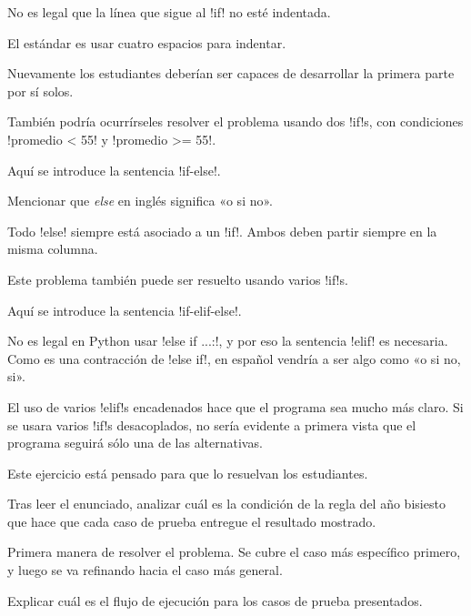 \documentclass[10pt]{article}
\begin{document}
  No es legal que la línea que sigue al \li!if! no esté indentada.

  El estándar es usar cuatro espacios para indentar.


  Nuevamente los estudiantes deberían ser capaces de desarrollar la primera parte por sí solos.

  También podría ocurrírseles resolver el problema usando dos \li!if!s,
  con condiciones \li!promedio < 55! y \li!promedio >= 55!.


  Aquí se introduce la sentencia \li!if-else!.
  
  Mencionar que \emph{else} en inglés significa «o si no».

  Todo \li!else! siempre está asociado a un \li!if!.
  Ambos deben partir siempre en la misma columna.


  Este problema también puede ser resuelto
  usando varios \li!if!s.


  Aquí se introduce la sentencia \li!if-elif-else!.

  No es legal en Python usar \li!else if ...:!,
  y por eso la sentencia \li!elif! es necesaria.
  Como es una contracción de \li!else if!,
  en español vendría a ser algo como «o si no, si».

  El uso de varios \li!elif!s encadenados
  hace que el programa sea mucho más claro.
  Si se usara varios \li!if!s desacoplados,
  no sería evidente a primera vista
  que el programa seguirá sólo una de las alternativas.


  Este ejercicio está pensado para que lo resuelvan los estudiantes.

  Tras leer el enunciado,
  analizar cuál es la condición de la regla del año bisiesto
  que hace que cada caso de prueba entregue el resultado mostrado.
  

  Primera manera de resolver el problema.
  Se cubre el caso más específico primero,
  y luego se va refinando hacia el caso más general.

  Explicar cuál es el flujo de ejecución
  para los casos de prueba presentados.

\end{document}
